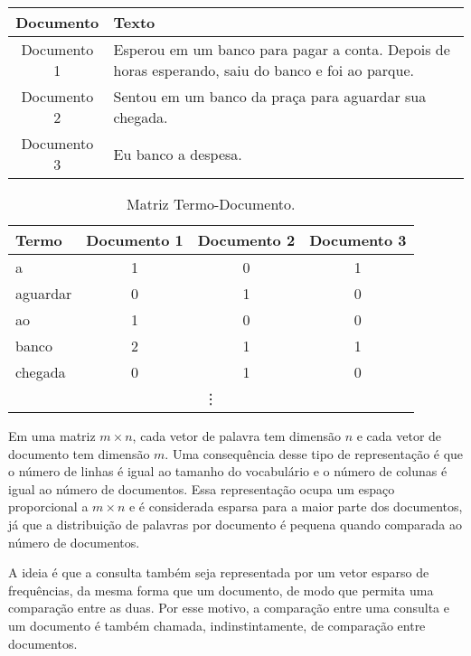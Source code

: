 \documentclass[
	12pt,				%
	openright,			%
	oneside,			%
	a4paper,			%
	english,			%
	french,				%
	spanish,			%
	brazil				%
	]{abntex2}
\begin{document}
\begin{center}
\begin{tabularx}{\textwidth}{|c|X|}
\hline
Documento & Texto \\
\hline
Documento 1 & Esperou em um banco para pagar a conta. Depois de horas esperando, saiu do banco e foi ao parque. \\
\hline
Documento 2 & Sentou em um banco da praça para aguardar sua chegada. \\
\hline
Documento 3 & Eu banco a despesa. \\
\hline
\end{tabularx}
\end{center}


\begin{table}[ht]
\centering
\caption{Matriz Termo-Documento.}
\label{tab:term-doc-matrix}
\begin{tabular}{|l|c|c|c|}
\hline
Termo     & Documento 1 & Documento 2 & Documento 3 \\
\hline
a         & 1           & 0           & 1           \\
\hline
aguardar  & 0           & 1           & 0           \\
\hline
ao        & 1           & 0           & 0           \\
\hline
banco     & 2           & 1           & 1           \\
\hline
chegada   & 0           & 1           & 0           \\
\hline
\multicolumn{4}{c}{\vdots} \\
\end{tabular}
\end{table}


Em uma matriz $m \times n$, cada vetor de palavra tem dimensão $n$ e cada vetor de documento tem dimensão $m$.
Uma consequência desse tipo de representação é que o número de linhas é igual ao tamanho do vocabulário e o número de colunas é igual ao número de documentos.
Essa representação ocupa um espaço proporcional a $m \times n$ e é considerada esparsa para a maior parte dos documentos, já que a distribuição de palavras por documento é pequena quando comparada ao número de documentos.
\cite{JurafskyMartin2023}

A ideia é que a consulta também seja representada por um vetor esparso de frequências, da mesma forma que um documento, de modo que permita uma comparação entre as duas.
Por esse motivo, a comparação entre uma consulta e um documento é também chamada, indinstintamente, de comparação entre documentos.
\end{document}
